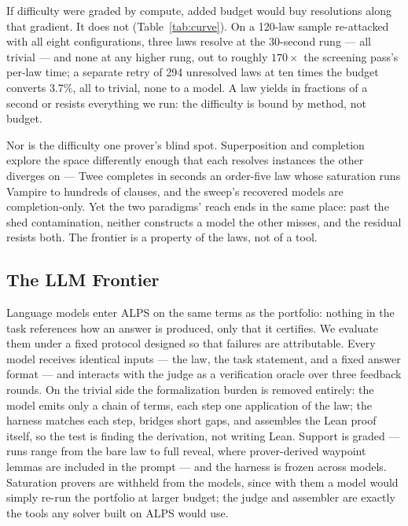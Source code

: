 \documentclass[letterpaper]{article} %
\begin{document}
If difficulty were graded by compute, added budget would buy resolutions along that gradient. It does not (Table~\ref{tab:curve}). On a 120-law sample re-attacked with all eight configurations, three laws resolve at the 30-second rung — all trivial — and none at any higher rung, out to roughly $170\times$ the screening pass's per-law time; a separate retry of 294 unresolved laws at ten times the budget converts 3.7\%, all to trivial, none to a model. A law yields in fractions of a second or resists everything we run: the difficulty is bound by method, not budget.
 
Nor is the difficulty one prover's blind spot. Superposition and completion explore the space differently enough that each resolves instances the other diverges on — Twee completes in seconds an order-five law whose saturation runs Vampire to hundreds of clauses, and the sweep's recovered models are completion-only. Yet the two paradigms' reach ends in the same place: past the shed contamination, neither constructs a model the other misses, and the residual resists both. The frontier is a property of the laws, not of a tool.



 
\subsection{The LLM Frontier}
 
Language models enter ALPS on the same terms as the portfolio: nothing in the task references how an answer is produced, only that it certifies. We evaluate them under a fixed protocol designed so that failures are attributable. Every model receives identical inputs — the law, the task statement, and a fixed answer format — and interacts with the judge as a verification oracle over three feedback rounds. On the trivial side the formalization burden is removed entirely: the model emits only a chain of terms, each step one application of the law; the harness matches each step, bridges short gaps, and assembles the Lean proof itself, so the test is finding the derivation, not writing Lean. Support is graded — runs range from the bare law to full reveal, where prover-derived waypoint lemmas are included in the prompt — and the harness is frozen across models. Saturation provers are withheld from the models, since with them a model would simply re-run the portfolio at larger budget; the judge and assembler are exactly the tools any solver built on ALPS would use.
 
\end{document}
